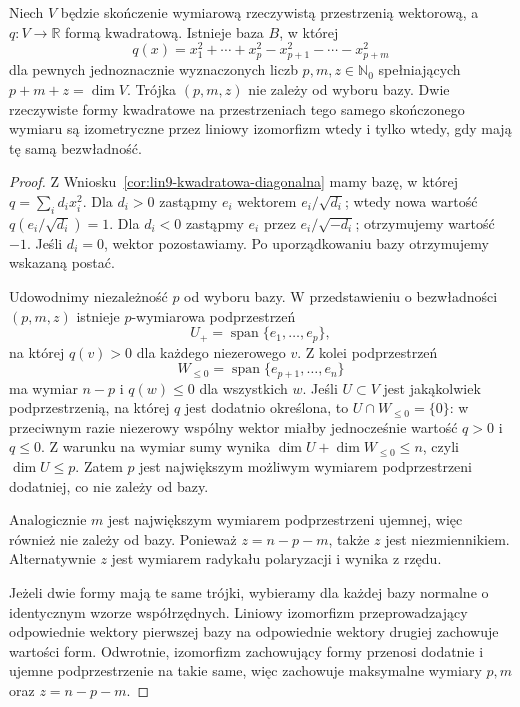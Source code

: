 \begin{twierdzenie}
\label{thm:lin9-sylvester}
Niech \(V\) będzie
skończenie wymiarową
rzeczywistą przestrzenią
wektorową, a
\(q\colon V\to\mathbb R\)
formą kwadratową.
Istnieje baza \(B\), w której
\[
 q(x)=x_1^2+\cdots+x_p^2
       -x_{p+1}^2-\cdots-x_{p+m}^2
\]
dla pewnych jednoznacznie
wyznaczonych liczb
\(p,m,z\in\mathbb N_0\)
spełniających \(p+m+z=\dim V\).
Trójka \((p,m,z)\) nie zależy
od wyboru bazy.
Dwie rzeczywiste formy kwadratowe
na przestrzeniach tego samego
skończonego wymiaru są
izometryczne przez liniowy
izomorfizm wtedy i tylko wtedy,
gdy mają tę samą bezwładność.
\end{twierdzenie}
\begin{proof}
Z
Wniosku~\ref{cor:lin9-kwadratowa-diagonalna}
mamy bazę, w której
\(q=\sum_i d_ix_i^2\).
Dla \(d_i>0\) zastąpmy
\(e_i\) wektorem
\(e_i/\sqrt{d_i}\);
wtedy nowa wartość
\(q(e_i/\sqrt{d_i})=1\).
Dla \(d_i<0\) zastąpmy
\(e_i\) przez
\(e_i/\sqrt{-d_i}\);
otrzymujemy wartość \(-1\).
Jeśli \(d_i=0\),
wektor pozostawiamy.
Po uporządkowaniu bazy
otrzymujemy wskazaną postać.

Udowodnimy niezależność \(p\)
od wyboru bazy.
W przedstawieniu o bezwładności
\((p,m,z)\) istnieje
\(p\)-wymiarowa podprzestrzeń
\[
 U_+=\operatorname{span}\{e_1,\ldots,e_p\},
\]
na której \(q(v)>0\)
dla każdego niezerowego \(v\).
Z kolei podprzestrzeń
\[
 W_{\le0}=
 \operatorname{span}\{e_{p+1},\ldots,e_n\}
\]
ma wymiar \(n-p\) i
\(q(w)\le0\) dla wszystkich \(w\).
Jeśli \(U\subset V\) jest
jakąkolwiek podprzestrzenią,
na której \(q\) jest dodatnio
określona, to
\(U\cap W_{\le0}=\{0\}\):
w przeciwnym razie
niezerowy wspólny wektor
miałby jednocześnie wartość
\(q>0\) i \(q\le0\).
Z warunku na wymiar sumy
wynika
\(\dim U+\dim W_{\le0}\le n\),
czyli \(\dim U\le p\).
Zatem \(p\) jest największym
możliwym wymiarem
podprzestrzeni dodatniej,
co nie zależy od bazy.

Analogicznie \(m\) jest
największym wymiarem
podprzestrzeni ujemnej,
więc również nie zależy
od bazy. Ponieważ
\(z=n-p-m\), także \(z\)
jest niezmiennikiem.
Alternatywnie \(z\) jest
wymiarem radykału
polaryzacji i wynika z rzędu.

Jeżeli dwie formy mają
te same trójki, wybieramy
dla każdej bazy normalne
o identycznym wzorze
współrzędnych.
Liniowy izomorfizm
przeprowadzający odpowiednie
wektory pierwszej bazy
na odpowiednie wektory drugiej
zachowuje wartości form.
Odwrotnie, izomorfizm
zachowujący formy przenosi
dodatnie i ujemne podprzestrzenie
na takie same, więc zachowuje
maksymalne wymiary \(p,m\)
oraz \(z=n-p-m\).
\end{proof}

